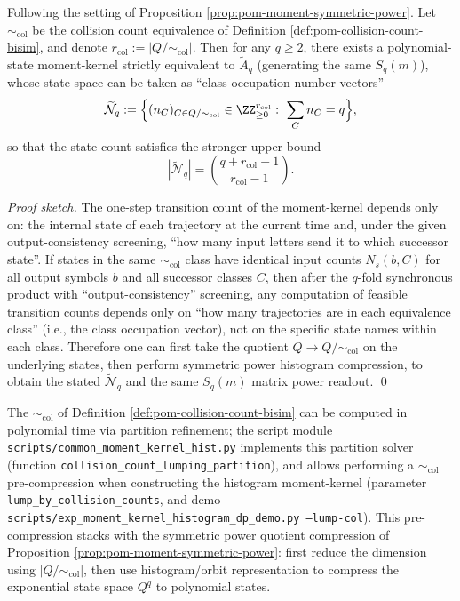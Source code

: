 \begin{proposition}[Pre-compression before symmetric power: replacing \texorpdfstring{$|Q|$}{|Q|} with \texorpdfstring{$r_{\mathrm{col}}=|Q/{\sim_{\mathrm{col}}}|$}{rcol}]\label{prop:pom-moment-col-lumping}
Following the setting of Proposition \ref{prop:pom-moment-symmetric-power}.
Let \(\sim_{\mathrm{col}}\) be the collision count equivalence of Definition \ref{def:pom-collision-count-bisim}, and denote
\(
r_{\mathrm{col}}:=|Q/{\sim_{\mathrm{col}}}|.
\)
Then for any \(q\ge 2\), there exists a polynomial-state moment-kernel strictly equivalent to \(\widetilde A_q\) (generating the same \(S_q(m)\)), whose state space can be taken as ``class occupation number vectors''
\[
\widetilde{\mathcal{N}}_{q}:=\Bigl\{(n_{C})_{C\in Q/{\sim_{\mathrm{col}}}}\in\ZZ_{\ge 0}^{r_{\mathrm{col}}}:\ \sum_{C}n_{C}=q\Bigr\},
\]
so that the state count satisfies the stronger upper bound
\[
|\widetilde{\mathcal{N}}_q|=\binom{q+r_{\mathrm{col}}-1}{r_{\mathrm{col}}-1}.
\]
\end{proposition}

\begin{proof}[Proof sketch]
The one-step transition count of the moment-kernel depends only on: the internal state of each trajectory at the current time and, under the given output-consistency screening, ``how many input letters send it to which successor state''.
If states in the same \(\sim_{\mathrm{col}}\) class have identical input counts \(N_s(b,C)\) for all output symbols \(b\) and all successor classes \(C\), then after the \(q\)-fold synchronous product with ``output-consistency'' screening, any computation of feasible transition counts depends only on ``how many trajectories are in each equivalence class'' (i.e., the class occupation vector), not on the specific state names within each class.
Therefore one can first take the quotient \(Q\to Q/{\sim_{\mathrm{col}}}\) on the underlying states, then perform symmetric power histogram compression, to obtain the stated \(\widetilde{\mathcal{N}}_q\) and the same \(S_q(m)\) matrix power readout. \qed
\end{proof}

\begin{remark}\label{rem:pom-moment-col-lumping-impl}
The \(\sim_{\mathrm{col}}\) of Definition \ref{def:pom-collision-count-bisim} can be computed in polynomial time via partition refinement;
the script module \texttt{scripts/common\_moment\_kernel\_hist.py} implements this partition solver (function \texttt{collision\_count\_lumping\_partition}), and allows performing a \(\sim_{\mathrm{col}}\) pre-compression when constructing the histogram moment-kernel (parameter \texttt{lump\_by\_collision\_counts}, and demo \texttt{scripts/exp\_moment\_kernel\_histogram\_dp\_demo.py --lump-col}).
This pre-compression stacks with the symmetric power quotient compression of Proposition \ref{prop:pom-moment-symmetric-power}: first reduce the dimension using \(|Q/{\sim_{\mathrm{col}}}|\), then use histogram/orbit representation to compress the exponential state space \(Q^q\) to polynomial states.
\end{remark}

